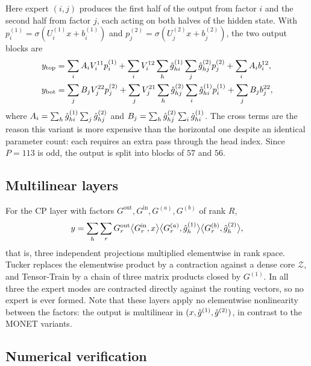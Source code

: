Here expert $(i,j)$ produces the first half of the output from factor $i$ and
the second half from factor $j$, each acting on both halves of the hidden
state. With $p^{(1)}_i = \sigma(U^{(1)}_i x + b^{(1)}_i)$ and $p^{(2)}_j =
\sigma(U^{(2)}_j x + b^{(2)}_j)$, the two output blocks are
\begin{align}
  y_{\mathrm{top}} &= \sum_i A_i V^{11}_i p^{(1)}_i
                    + \sum_i V^{12}_i \sum_h \hat{g}^{(1)}_{hi}
                      \sum_j \hat{g}^{(2)}_{hj} p^{(2)}_j
                    + \sum_i A_i b^{12}_i, \\
  y_{\mathrm{bot}} &= \sum_j B_j V^{22}_j p^{(2)}_j
                    + \sum_j V^{21}_j \sum_h \hat{g}^{(2)}_{hj}
                      \sum_i \hat{g}^{(1)}_{hi} p^{(1)}_i
                    + \sum_j B_j b^{22}_j,
\end{align}
where $A_i = \sum_h \hat{g}^{(1)}_{hi}\sum_j \hat{g}^{(2)}_{hj}$ and $B_j = \sum_h
\hat{g}^{(2)}_{hj}\sum_i \hat{g}^{(1)}_{hi}$. The cross terms are the reason this
variant is more expensive than the horizontal one despite an identical
parameter count: each requires an extra pass through the head index. Since
$P = 113$ is odd, the output is split into blocks of $57$ and $56$.

\subsection{Multilinear layers}

For the CP layer with factors $G^{\mathrm{out}}, G^{\mathrm{in}},
G^{(a)}, G^{(b)}$ of rank $R$,
\begin{equation}
  y = \sum_{h}\sum_{r}
      G^{\mathrm{out}}_{r}
      \big\langle G^{\mathrm{in}}_{r}, x \big\rangle
      \big\langle G^{(a)}_{r}, \hat{g}^{(1)}_{h} \big\rangle
      \big\langle G^{(b)}_{r}, \hat{g}^{(2)}_{h} \big\rangle,
\end{equation}
that is, three independent projections multiplied elementwise in rank space.
Tucker replaces the elementwise product by a contraction against a dense core
$\mathcal{Z}$, and Tensor-Train by a chain of three matrix products closed by
$G^{(1)}$. In all three the expert modes are contracted directly against the
routing vectors, so no expert is ever formed. Note that these layers apply no
elementwise nonlinearity between the factors: the output is multilinear in
$(x, \hat{g}^{(1)}, \hat{g}^{(2)})$, in contrast to the MONET variants.

\subsection{Numerical verification}

